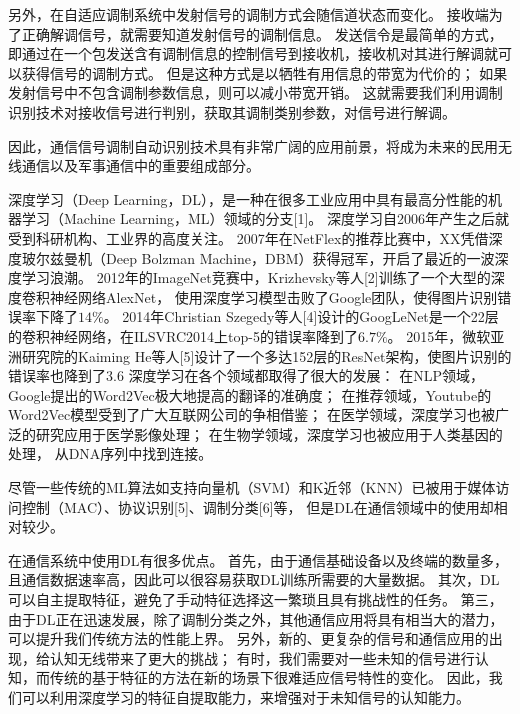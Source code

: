 另外，在自适应调制系统中发射信号的调制方式会随信道状态而变化。
接收端为了正确解调信号，就需要知道发射信号的调制信息。
发送信令是最简单的方式，即通过在一个包发送含有调制信息的控制信号到接收机，接收机对其进行解调就可以获得信号的调制方式。
但是这种方式是以牺牲有用信息的带宽为代价的；
如果发射信号中不包含调制参数信息，则可以减小带宽开销。
这就需要我们利用调制识别技术对接收信号进行判别，获取其调制类别参数，对信号进行解调。\par

因此，通信信号调制自动识别技术具有非常广阔的应用前景，将成为未来的民用无线通信以及军事通信中的重要组成部分。\par

深度学习（Deep Learning，DL），是一种在很多工业应用中具有最高分性能的机器学习（Machine Learning，ML）领域的分支[1]。 
深度学习自2006年产生之后就受到科研机构、工业界的高度关注。
2007年在NetFlex的推荐比赛中，XX凭借深度玻尔兹曼机（Deep Bolzman Machine，DBM）获得冠军，开启了最近的一波深度学习浪潮。
2012年的ImageNet竞赛中，Krizhevsky等人[2]训练了一个大型的深度卷积神经网络AlexNet，
使用深度学习模型击败了Google团队，使得图片识别错误率下降了$14\%$。
2014年Christian Szegedy等人[4]设计的GoogLeNet是一个22层的卷积神经网络，在ILSVRC2014上top-5的错误率降到了$6.7\%$。
2015年，微软亚洲研究院的Kaiming He等人[5]设计了一个多达152层的ResNet架构，使图片识别的错误率也降到了3.6%
深度学习在各个领域都取得了很大的发展：
在NLP领域，Google提出的Word2Vec极大地提高的翻译的准确度；
在推荐领域，Youtube的Word2Vec模型受到了广大互联网公司的争相借鉴；
在医学领域，深度学习也被广泛的研究应用于医学影像处理；
在生物学领域，深度学习也被应用于人类基因的处理， 从DNA序列中找到连接。\par

尽管一些传统的ML算法如支持向量机（SVM）和K近邻（KNN）已被用于媒体访问控制（MAC）、协议识别[5]、调制分类[6]等，
但是DL在通信领域中的使用却相对较少。\par

在通信系统中使用DL有很多优点。 
首先，由于通信基础设备以及终端的数量多，且通信数据速率高，因此可以很容易获取DL训练所需要的大量数据。
其次，DL可以自主提取特征，避免了手动特征选择这一繁琐且具有挑战性的任务。
第三，由于DL正在迅速发展，除了调制分类之外，其他通信应用将具有相当大的潜力，可以提升我们传统方法的性能上界。
另外，新的、更复杂的信号和通信应用的出现，给认知无线带来了更大的挑战；
有时，我们需要对一些未知的信号进行认知，而传统的基于特征的方法在新的场景下很难适应信号特性的变化。
因此，我们可以利用深度学习的特征自提取能力，来增强对于未知信号的认知能力。\par

